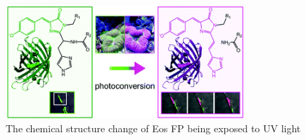 \documentclass[a4paper,english,12pt,bibliography=totoc]{scrreprt}
\begin{document}
\begin{figure}[H]
    \centering
    \includegraphics[width = 0.8\textwidth]{Figures/bond_change.png}
    \caption{The chemical structure change of Eos FP being exposed to UV light\cite{D1CB00014D}}
    \label{fig:enter-label}
\end{figure}
\end{document}
